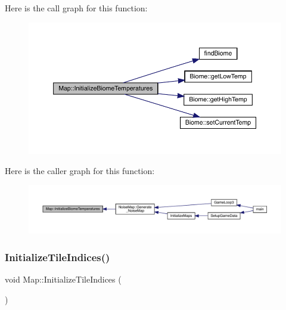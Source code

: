 Here is the call graph for this function\+:
\nopagebreak
\begin{figure}[H]
\begin{center}
\leavevmode
\includegraphics[width=350pt]{class_map_ae5a05885aef979310e900b8343679abd_cgraph}
\end{center}
\end{figure}
Here is the caller graph for this function\+:
\nopagebreak
\begin{figure}[H]
\begin{center}
\leavevmode
\includegraphics[width=350pt]{class_map_ae5a05885aef979310e900b8343679abd_icgraph}
\end{center}
\end{figure}
\mbox{\label{class_map_a5227c01512d16adc154ee48b8967e14b}} 
\subsubsection{\texorpdfstring{Initialize\+Tile\+Indices()}{InitializeTileIndices()}}
{\footnotesize\ttfamily void Map\+::\+Initialize\+Tile\+Indices (\begin{DoxyParamCaption}{ }\end{DoxyParamCaption})}

\mbox{\label{class_map_a22f7804f69757183a8b7093cf5b136ac}} 
